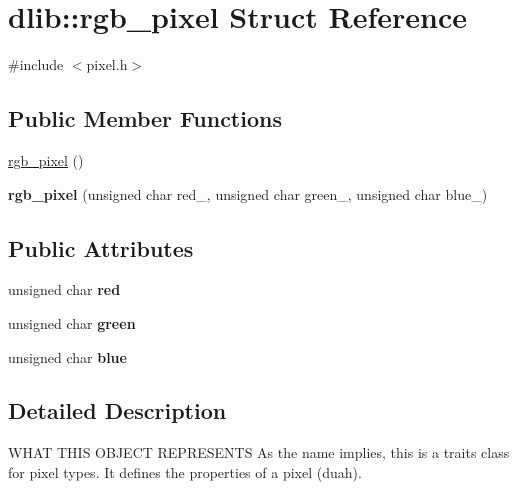 \hypertarget{structdlib_1_1rgb__pixel}{
\section{dlib::rgb\_\-pixel Struct Reference}
\label{structdlib_1_1rgb__pixel}
}


{\ttfamily \#include $<$pixel.h$>$}\subsection*{Public Member Functions}
\begin{DoxyCompactItemize}
\item 
\hyperlink{structdlib_1_1rgb__pixel_afa497c6467591efaeef930a7a629e704}{rgb\_\-pixel} ()
\item 
\hypertarget{structdlib_1_1rgb__pixel_a1987deac187c56f077ecb56b0b8a3f78}{
{\bfseries rgb\_\-pixel} (unsigned char red\_\-, unsigned char green\_\-, unsigned char blue\_\-)}
\label{structdlib_1_1rgb__pixel_a1987deac187c56f077ecb56b0b8a3f78}

\end{DoxyCompactItemize}
\subsection*{Public Attributes}
\begin{DoxyCompactItemize}
\item 
\hypertarget{structdlib_1_1rgb__pixel_a96e38b486b457e139bfd32324e2720e1}{
unsigned char {\bfseries red}}
\label{structdlib_1_1rgb__pixel_a96e38b486b457e139bfd32324e2720e1}

\item 
\hypertarget{structdlib_1_1rgb__pixel_a6323dc8b311672d5e54834be5cc2bb3a}{
unsigned char {\bfseries green}}
\label{structdlib_1_1rgb__pixel_a6323dc8b311672d5e54834be5cc2bb3a}

\item 
\hypertarget{structdlib_1_1rgb__pixel_aad17a4b79e9509bab1688a9078d6d5fb}{
unsigned char {\bfseries blue}}
\label{structdlib_1_1rgb__pixel_aad17a4b79e9509bab1688a9078d6d5fb}

\end{DoxyCompactItemize}


\subsection{Detailed Description}
WHAT THIS OBJECT REPRESENTS As the name implies, this is a traits class for pixel types. It defines the properties of a pixel (duah).

